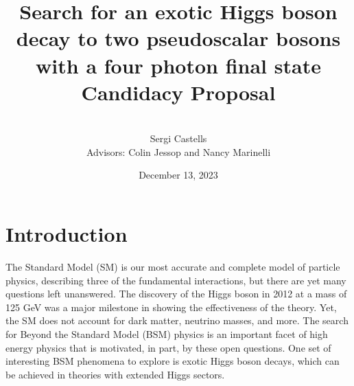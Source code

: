 \documentclass[12pt]{article}
\title{
    Search for an exotic Higgs boson decay to two pseudoscalar bosons with a four photon final state\\[0.2cm]
    \Large Candidacy Proposal
}
\author{\\[0.15cm]Sergi Castells\\[0.25cm] Advisors: Colin Jessop and Nancy Marinelli\\[0.4cm]}
\date{December 13, 2023}
\begin{document}
\maketitle


\section{Introduction}
The Standard Model (SM) is our most accurate and complete model of particle physics, describing three of the fundamental interactions, but there are yet many questions left unanswered. The discovery of the Higgs boson in 2012 at a mass of 125 GeV was a major milestone in showing the effectiveness of the theory. Yet, the SM does not account for dark matter, neutrino masses, and more. The search for Beyond the Standard Model (BSM) physics is an important facet of high energy physics that is motivated, in part, by these open questions. One set of interesting BSM phenomena to explore is exotic Higgs boson decays, which can be achieved in theories with extended Higgs sectors.\par


\end{document}
